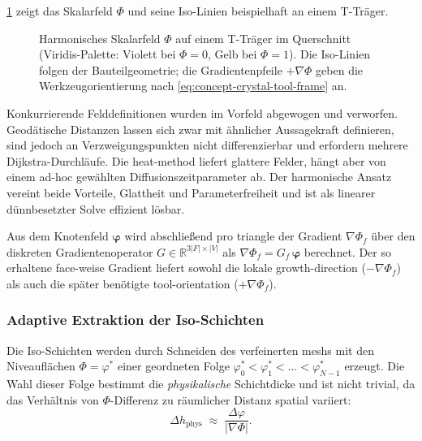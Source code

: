                 \cref{fig:concept-crystal-phi-field} zeigt das Skalarfeld $\Phi$ und seine Iso-Linien beispielhaft an einem T-Träger.

                \begin{figure}[ht]
                    \centering
                    
                    \caption[Skalarfeld $\Phi$ und Iso-Linien am T-Träger]{
                        Harmonisches Skalarfeld $\Phi$ auf einem T-Träger im Querschnitt (Viridis-Palette: Violett bei $\Phi=0$, Gelb bei $\Phi=1$).
                        Die Iso-Linien folgen der Bauteilgeometrie; die Gradientenpfeile $+\nabla\Phi$ geben die Werkzeugorientierung nach \cref{eq:concept-crystal-tool-frame} an.
                    }
                    \label{fig:concept-crystal-phi-field}
                \end{figure}

                Konkurrierende Felddefinitionen wurden im Vorfeld abgewogen und verworfen.
                Geodätische Distanzen lassen sich zwar mit ähnlicher Aussagekraft definieren, sind jedoch an Verzweigungspunkten nicht differenzierbar und erfordern mehrere Dijkstra-Durchläufe.
                Die \gls{heat-method} \autocite[vgl.][S.~3--4]{craneGeodesicsHeatNew2013} liefert glattere Felder, hängt aber von einem ad-hoc gewählten Diffusionszeitparameter ab.
                Der harmonische Ansatz vereint beide Vorteile, Glattheit und Parameterfreiheit und ist als linearer dünnbesetzter Solve effizient lösbar.

                Aus dem Knotenfeld $\boldsymbol{\varphi}$ wird abschließend pro \gls{triangle} der Gradient $\nabla\Phi_f$ über den diskreten Gradientenoperator $G \in \mathbb{R}^{3|F| \times |V|}$ als $\nabla\Phi_f = G_f\,\boldsymbol{\varphi}$ berechnet.
                Der so erhaltene face-weise Gradient liefert sowohl die lokale \gls{growth-direction} ($-\nabla\Phi_f$) als auch die später benötigte \gls{tool-orientation} ($+\nabla\Phi_f$).

            \subsubsection{Adaptive Extraktion der Iso-Schichten}\label{subsubsec:concept-crystal-iso-extraction} 
                Die Iso-Schichten werden durch Schneiden des verfeinerten \glspl{mesh} mit den Niveauflächen $\Phi = \varphi^*$ einer geordneten Folge $\varphi^*_0 < \varphi^*_1 < \dots < \varphi^*_{N-1}$ erzeugt.
                Die Wahl dieser Folge bestimmt die \emph{physikalische} Schichtdicke und ist nicht trivial, da das Verhältnis von $\Phi$-Differenz zu räumlicher Distanz spatial variiert:
                \begin{equation}
                    \Delta h_\text{phys} \;\approx\; \frac{\Delta \varphi}{|\nabla\Phi|}.
                    \label{eq:concept-crystal-physical-thickness}
                \end{equation}

